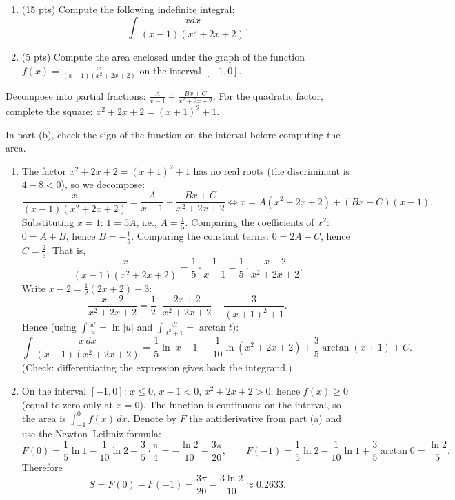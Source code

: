 
\begin{question}
\begin{enumerate}
  \item (15 pts) Compute the following indefinite integral:
  \[ \int\frac{xdx}{(x-1)(x^2+2x+2)}. \]
  \item (5 pts) Compute the area enclosed under the graph of the function $f(x)=\frac{x}{(x-1)(x^2+2x+2)}$ on the interval $[-1,0]$.
\end{enumerate}
\end{question}

\begin{hint}
Decompose into partial fractions: $\frac{A}{x-1}+\frac{Bx+C}{x^2+2x+2}$. For the quadratic factor, complete the square: $x^2+2x+2=(x+1)^2+1$.
\end{hint}

\begin{hint}
In part (b), check the sign of the function on the interval before computing the area.
\end{hint}

\begin{solution}
\begin{enumerate}
  \item The factor $x^2+2x+2=(x+1)^2+1$ has no real roots (the discriminant is $4-8<0$), so we decompose:
  \[ \frac{x}{(x-1)(x^2+2x+2)}=\frac{A}{x-1}+\frac{Bx+C}{x^2+2x+2}
     \iff x=A(x^2+2x+2)+(Bx+C)(x-1). \]
  Substituting $x=1$: $1=5A$, i.e., $A=\frac15$. Comparing the coefficients of $x^2$: $0=A+B$, hence $B=-\frac15$. Comparing the constant terms: $0=2A-C$, hence $C=\frac25$. That is,
  \[ \frac{x}{(x-1)(x^2+2x+2)}=\frac{1}{5}\cdot\frac{1}{x-1}-\frac15\cdot\frac{x-2}{x^2+2x+2}. \]
  Write $x-2=\frac12(2x+2)-3$:
  \[ \frac{x-2}{x^2+2x+2}=\frac12\cdot\frac{2x+2}{x^2+2x+2}-\frac{3}{(x+1)^2+1}. \]
  Hence (using $\int\frac{u'}{u}=\ln|u|$ and $\int\frac{dt}{t^2+1}=\arctan t$):
  \[ \boxed{\int\frac{x\,dx}{(x-1)(x^2+2x+2)}=\frac15\ln|x-1|-\frac1{10}\ln(x^2+2x+2)+\frac35\arctan(x+1)+C.} \]
  (Check: differentiating the expression gives back the integrand.)

  \item On the interval $[-1,0]$: $x\le 0$, $x-1<0$, $x^2+2x+2>0$, hence $f(x)\ge0$ (equal to zero only at $x=0$). The function is continuous on the interval, so the area is $\int_{-1}^0 f(x)\,dx$. Denote by $F$ the antiderivative from part (a) and use the Newton--Leibniz formula:
  \[ F(0)=\frac15\ln1-\frac1{10}\ln2+\frac35\cdot\frac\pi4=-\frac{\ln2}{10}+\frac{3\pi}{20},\qquad
     F(-1)=\frac15\ln2-\frac1{10}\ln1+\frac35\arctan0=\frac{\ln 2}{5}. \]
  Therefore
  \[ S=F(0)-F(-1)=\boxed{\frac{3\pi}{20}-\frac{3\ln2}{10}}\approx 0.2633. \]
\end{enumerate}
\end{solution}
